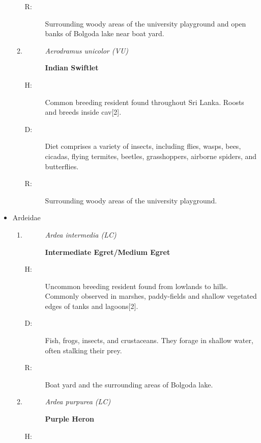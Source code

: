 \begin{itemize}
\begin{enumerate}
\begin{description}
\item[R: ]%
Surrounding woody areas of the university playground and open banks of Bolgoda lake near boat yard.%
\end{description}%
\item%
\begin{description}%
\item[]%
\textit{Aerodramus unicolor (VU)}%
\item[]%
\textbf{Indian Swiftlet}%
\end{description}%
\begin{description}%
\item[H: ]%
Common breeding resident found throughout Sri Lanka. Roosts and breeds inside cav{[}2{]}.%
\item[D: ]%
Diet comprises a variety of insects, including flies, wasps, bees, cicadas, flying termites, beetles, grasshoppers, airborne spiders, and butterflies.%
\item[R: ]%
Surrounding woody areas of the university playground.%
\end{description}%
\end{enumerate}%
\item%
Ardeidae%
\begin{enumerate}%
\item%
\begin{description}%
\item[]%
\textit{Ardea intermedia (LC)}%
\item[]%
\textbf{Intermediate Egret/Medium Egret}%
\end{description}%
\begin{description}%
\item[H: ]%
Uncommon breeding resident found from lowlands to hills. Commonly observed in marshes, paddy-fields and shallow vegetated edges of tanks and lagoons{[}2{]}.%
\item[D: ]%
Fish, frogs, insects, and crustaceans. They forage in shallow water, often stalking their prey.%
\item[R: ]%
Boat yard and the surrounding areas of Bolgoda lake.%
\end{description}%
\item%
\begin{description}%
\item[]%
\textit{Ardea purpurea (LC)}%
\item[]%
\textbf{Purple Heron}%
\end{description}%
\begin{description}%
\item[H: ]%

\end{description}
\end{enumerate}
\end{itemize}
